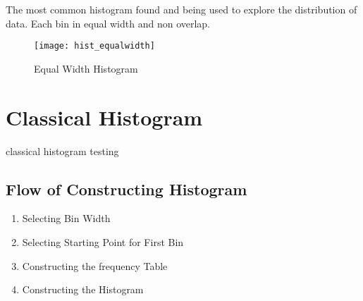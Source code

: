 %
%
%
%
%
%
%



The most common histogram found and being used to explore the distribution of data. Each bin in equal width and non overlap.

\begin{figure}[h]
	\caption{Equal Width Histogram}
	\centering \texttt{[image: hist\_equalwidth]}
\end{figure}

\section{Classical Histogram}

classical histogram testing

\subsection{Flow of Constructing Histogram}
\begin{enumerate}
	\item Selecting Bin Width
	\item Selecting Starting Point for First Bin
	\item Constructing the frequency Table
	\item Constructing the Histogram
\end{enumerate}

